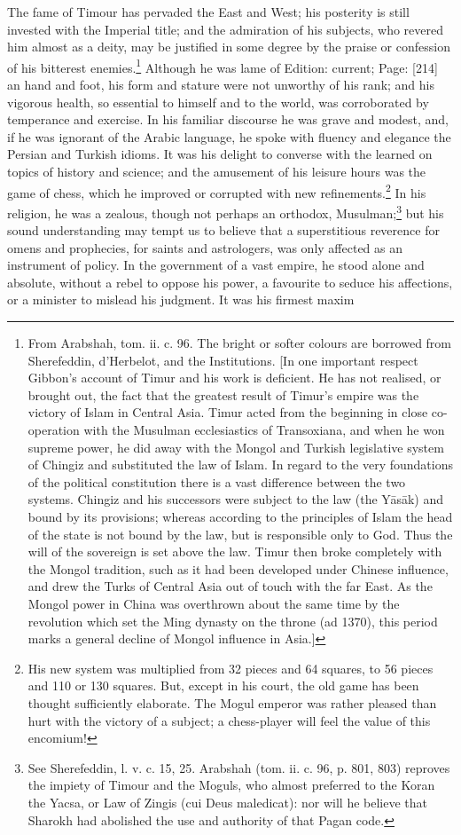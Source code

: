 The fame of Timour has pervaded the East and West; his posterity is still invested with the Imperial title; and the admiration of his subjects, who revered him almost as a deity, may be justified in some degree by the praise or confession of his bitterest enemies.\footnote{From Arabshah, tom. ii. c. 96. The bright or softer colours are borrowed from Sherefeddin, d\texthebrew{}’Herbelot, and the Institutions. [In one important respect Gibbon\texthebrew{}’s account of Timur and his work is deficient. He has not realised, or brought out, the fact that the greatest result of Timur\texthebrew{}’s empire was the victory of Islam in Central Asia. Timur acted from the beginning in close co-operation with the Musulman ecclesiastics of Transoxiana, and when he won supreme power, he did away with the Mongol and Turkish legislative system of Chingiz and substituted the law of Islam. In regard to the very foundations of the political constitution there is a vast difference between the two systems. Chingiz and his successors were subject to the law (the Yāsāk) and bound by its provisions; whereas according to the principles of Islam the head of the state is not bound by the law, but is responsible only to God. Thus the will of the sovereign is set above the law. Timur then broke completely with the Mongol tradition, such as it had been developed under Chinese influence, and drew the Turks of Central Asia out of touch with the far East. As the Mongol power in China was overthrown about the same time by the revolution which set the Ming dynasty on the throne (ad 1370), this period marks a general decline of Mongol influence in Asia.]} Although he was lame of Edition: current; Page: [214] an hand and foot, his form and stature were not unworthy of his rank; and his vigorous health, so essential to himself and to the world, was corroborated by temperance and exercise. In his familiar discourse he was grave and modest, and, if he was ignorant of the Arabic language, he spoke with fluency and elegance the Persian and Turkish idioms. It was his delight to converse with the learned on topics of history and science; and the amusement of his leisure hours was the game of chess, which he improved or corrupted with new refinements.\footnote{His new system was multiplied from 32 pieces and 64 squares, to 56 pieces and 110 or 130 squares. But, except in his court, the old game has been thought sufficiently elaborate. The Mogul emperor was rather pleased than hurt with the victory of a subject; a chess-player will feel the value of this encomium!} In his religion, he was a zealous, though not perhaps an orthodox, Musulman;\footnote{See Sherefeddin, l. v. c. 15, 25. Arabshah (tom. ii. c. 96, p. 801, 803) reproves the impiety of Timour and the Moguls, who almost preferred to the Koran the Yacsa, or Law of Zingis (cui Deus maledicat): nor will he believe that Sharokh had abolished the use and authority of that Pagan code.} but his sound understanding may tempt us to believe that a superstitious reverence for omens and prophecies, for saints and astrologers, was only affected as an instrument of policy. In the government of a vast empire, he stood alone and absolute, without a rebel to oppose his power, a favourite to seduce his affections, or a minister to mislead his judgment. It was his firmest maxim 
